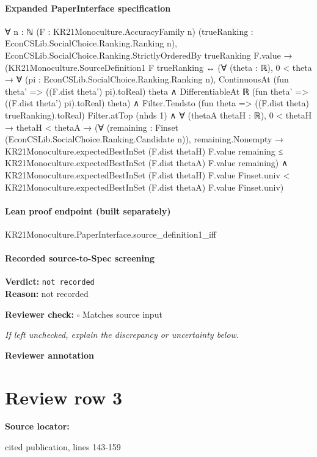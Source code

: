 \documentclass[10pt]{article}
\newcommand{\reviewerbox}{%
  \par\noindent\fbox{\parbox{0.96\linewidth}{\rule{0pt}{0.38in}}}\par
}
\newcommand{\reviewmatch}[1]{%
  \par\noindent\textbf{Reviewer check:} $\square$\; #1\par
  \noindent\emph{If left unchecked, explain the discrepancy or uncertainty below.}\par
}
\begin{document}
\paragraph{Expanded PaperInterface specification}
\begin{ReviewVerbatim}
∀ {n : ℕ} (F : KR21Monoculture.AccuracyFamily n) (trueRanking : EconCSLib.SocialChoice.Ranking.Ranking n),
  EconCSLib.SocialChoice.Ranking.StrictlyOrderedBy trueRanking F.value →
    (KR21Monoculture.SourceDefinition1 F trueRanking ↔
      (∀ (theta : ℝ),
          0 < theta →
            ∀ (pi : EconCSLib.SocialChoice.Ranking.Ranking n),
              ContinuousAt (fun theta' => ((F.dist theta') pi).toReal) theta ∧
                DifferentiableAt ℝ (fun theta' => ((F.dist theta') pi).toReal) theta) ∧
        Filter.Tendsto (fun theta => ((F.dist theta) trueRanking).toReal) Filter.atTop (nhds 1) ∧
          ∀ (thetaA thetaH : ℝ),
            0 < thetaH →
              thetaH < thetaA →
                (∀ (remaining : Finset (EconCSLib.SocialChoice.Ranking.Candidate n)),
                    remaining.Nonempty →
                      KR21Monoculture.expectedBestInSet (F.dist thetaH) F.value remaining ≤
                        KR21Monoculture.expectedBestInSet (F.dist thetaA) F.value remaining) ∧
                  KR21Monoculture.expectedBestInSet (F.dist thetaH) F.value Finset.univ <
                    KR21Monoculture.expectedBestInSet (F.dist thetaA) F.value Finset.univ)
\end{ReviewVerbatim}

\paragraph{Lean proof endpoint (built separately)}\begin{ReviewVerbatim}
KR21Monoculture.PaperInterface.source_definition1_iff
\end{ReviewVerbatim}

\paragraph{Recorded source-to-Spec screening}
\textbf{Verdict:} \texttt{not recorded}
\\
\textbf{Reason:} not recorded
\reviewmatch{Matches source input}
\noindent\textbf{Reviewer annotation}\par
\reviewerbox
\clearpage
\hypertarget{source-claim-413fc0a7e71398bc}{}
\section*{Review row 3}
\textbf{Source locator:} {\footnotesize\raggedright cited publication, lines 143-\allowbreak{}159\par}
\end{document}
